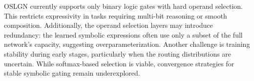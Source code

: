 OSLGN currently supports only binary logic gates with hard operand selection. This restricts expressivity in tasks requiring multi-bit reasoning or smooth composition. Additionally, the operand selection layers may introduce redundancy: the learned symbolic expressions often use only a subset of the full network’s capacity, suggesting overparameterization. Another challenge is training stability during early stages, particularly when the routing distributions are uncertain. While softmax-based selection is viable, convergence strategies for stable symbolic gating remain underexplored.
